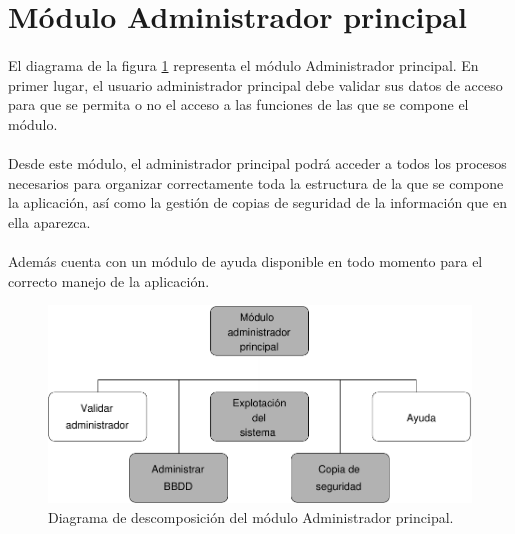 \section{Módulo Administrador principal}

  \paragraph{}El diagrama de la figura
  \ref{diagramaDescomposicionAdministradorPrincipal} representa el módulo
  Administrador principal. En primer lugar, el usuario administrador principal
  debe validar sus datos de acceso para que se permita o no el acceso a las
  funciones de las que se compone el módulo.

  \paragraph{}Desde este módulo, el administrador principal podrá acceder a
  todos los procesos necesarios para organizar correctamente toda la estructura
  de la que se compone la aplicación, así como la gestión de copias de seguridad
  de la información que en ella aparezca.

  \paragraph{}Además cuenta con un módulo de ayuda disponible en todo momento
  para el correcto manejo de la aplicación.

  \begin{figure}[!ht]
    \begin{center}
      \includegraphics[]{11.Disenyo_Arquitectonico/11.2.Diagramas_Descomposicion/11.2.2.Modulo_administrador_principal/Diagramas/administrador_principal.pdf}
      \caption{Diagrama de descomposición del módulo Administrador principal.}
      \label{diagramaDescomposicionAdministradorPrincipal}
    \end{center}
  \end{figure}


